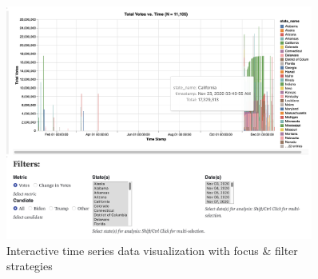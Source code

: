 \begin{figure}[H]
\centering
\captionsetup{justification=centering}
\includegraphics[width=0.9\textwidth]{./pics/time1.png}
\caption{Interactive time series data visualization with focus \& filter strategies \cite{2020timeseries} }
\label{fig:interactive-focus-filter}
\end{figure}
